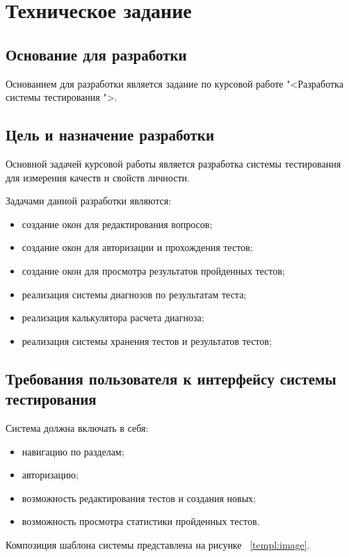 \section{Техническое задание}
\subsection{Основание для разработки}

Основанием для разработки является задание по курсовой работе "<Разработка системы тестирования \textquotedbl">.

\subsection{Цель и назначение разработки}

Основной задачей курсовой работы является разработка системы тестирования для измерения качеств и свойств личности.

Задачами данной разработки являются:
\begin{itemize}
\item создание окон для редактирования вопросов;
\item создание окон для авторизации и прохождения тестов;
\item создание окон для просмотра результатов пройденных тестов;
\item реализация системы диагнозов по результатам теста;
\item реализация калькулятора расчета диагноза;
\item реализация системы хранения тестов и результатов тестов;
\end{itemize}

\subsection{Требования пользователя к интерфейсу системы тестирования}

Система должна включать в себя:
\begin{itemize}
    \item навигацию по разделам;
    \item авторизацию;
    \item возможность редактирования тестов и создания новых;
    \item возможность просмотра статистики пройденных тестов.
\end{itemize}

Композиция шаблона системы представлена на рисунке ~\ref{templ:image}.

